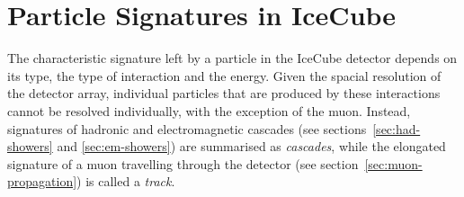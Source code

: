 \section{Particle Signatures in IceCube}

The characteristic signature left by a particle in the IceCube detector depends on its type, the type of interaction and the energy. Given the spacial resolution of the detector array, individual particles that are produced by these interactions cannot be resolved individually, with the exception of the muon. Instead, signatures of hadronic and electromagnetic cascades (see sections~\ref{sec:had-showers} and \ref{sec:em-showers}) are summarised as \emph{cascades}, while the elongated signature of a muon travelling through the detector (see section~\ref{sec:muon-propagation}) is called a \emph{track}.
